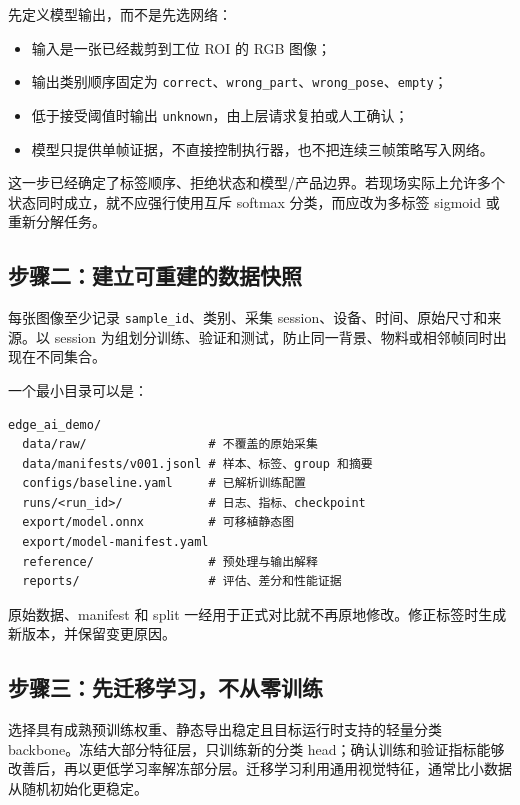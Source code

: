 先定义模型输出，而不是先选网络：

\begin{itemize}
  \item 输入是一张已经裁剪到工位 ROI 的 RGB 图像；
  \item 输出类别顺序固定为 \texttt{correct}、\texttt{wrong\_part}、\texttt{wrong\_pose}、\texttt{empty}；
  \item 低于接受阈值时输出 \texttt{unknown}，由上层请求复拍或人工确认；
  \item 模型只提供单帧证据，不直接控制执行器，也不把连续三帧策略写入网络。
\end{itemize}

这一步已经确定了标签顺序、拒绝状态和模型/产品边界。若现场实际上允许多个状态同时成立，就不应强行使用互斥 softmax 分类，而应改为多标签 sigmoid 或重新分解任务。

\subsection{步骤二：建立可重建的数据快照}

每张图像至少记录 \texttt{sample\_id}、类别、采集 session、设备、时间、原始尺寸和来源。以 session 为组划分训练、验证和测试，防止同一背景、物料或相邻帧同时出现在不同集合。

一个最小目录可以是：

\begin{lstlisting}[caption={第一个视觉项目的建议资产结构}]
edge_ai_demo/
  data/raw/                 # 不覆盖的原始采集
  data/manifests/v001.jsonl # 样本、标签、group 和摘要
  configs/baseline.yaml     # 已解析训练配置
  runs/<run_id>/            # 日志、指标、checkpoint
  export/model.onnx         # 可移植静态图
  export/model-manifest.yaml
  reference/                # 预处理与输出解释
  reports/                  # 评估、差分和性能证据
\end{lstlisting}

原始数据、manifest 和 split 一经用于正式对比就不再原地修改。修正标签时生成新版本，并保留变更原因。

\subsection{步骤三：先迁移学习，不从零训练}

选择具有成熟预训练权重、静态导出稳定且目标运行时支持的轻量分类 backbone。冻结大部分特征层，只训练新的分类 head；确认训练和验证指标能够改善后，再以更低学习率解冻部分层。迁移学习利用通用视觉特征，通常比小数据从随机初始化更稳定\cite{resnet,mobilenetv2}。

